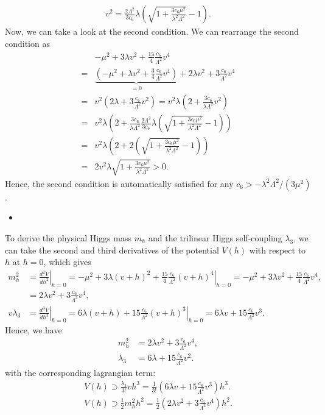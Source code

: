 \begin{align}
    v^2 = \frac{2\Lambda^2}{3 c_6} \lambda \left( \sqrt{1 + \frac{3 c_6 \mu^2}{\lambda^2 \Lambda^2}} - 1\right).
\end{align}
Now, we can take a look at the second condition. We can rearrange the second condition as
\begin{align}
    &-\mu^2 + 3\lambda v^2 + \frac{15}{4}\frac{c_6}{\Lambda^2} v^4 \\
    =&\underbrace{\left( -\mu^2  + \lambda v^2 + \frac{3}{4}\frac{c_6}{\Lambda^2} v^4 \right)}_{=0 }+ 2\lambda v^2 + 3\frac{c_6}{\Lambda^2} v^4 \\
    =&v^2 \left( 2\lambda + 3\frac{c_6}{\Lambda^2} v^2 \right)=v^2\lambda \left( 2 +  \frac{3 c_6}{\lambda \Lambda^2} v^2 \right) \\
    =&v^2\lambda \left( 2 +  \frac{3 c_6}{\lambda \Lambda^2} \frac{2\Lambda^2}{3 c_6} \lambda \left( \sqrt{1 + \frac{3 c_6 \mu^2}{\lambda^2 \Lambda^2}} - 1\right) \right) \\
    =&v^2\lambda \left( 2 + 2 \left( \sqrt{1 + \frac{3 c_6 \mu^2}{\lambda^2 \Lambda^2}} - 1\right) \right) \\
    =&2 v^2 \lambda \sqrt{1 + \frac{3 c_6 \mu^2}{\lambda^2 \Lambda^2}} >0.
\end{align}
Hence, the second condition is automatically satisfied for any $c_6>-\lambda^2 \Lambda^2/(3\mu^2)$.

\begin{itemize}
    \item [(b)]
\end{itemize}
To derive the physical Higgs mass $m_h$ and the trilinear Higgs self-coupling $\lambda_3$, we can take the second and third derivatives of the potential $V(h)$ with respect to $h$ at $h=0$, which gives
\begin{align}
    m_h^2 &= \left.\frac{d^2V}{dh^2}\right|_{h=0} = \left. -\mu^2 + 3\lambda (v+h)^2 +   \frac{15}{4}\frac{c_6}{\Lambda^2} (v+h)^4 \right|_{h=0} = -\mu^2 + 3\lambda v^2 + \frac{15}{4}\frac{c_6}{\Lambda^2} v^4, \\
    &= 2\lambda v^2 + 3\frac{c_6}{\Lambda^2} v^4, \\
    v\lambda_3 &= \left.\frac{d^3V}{dh^3}\right|_{h=0} = \left. 6\lambda (v+h) + 15 \frac{c_6}{\Lambda^2} (v+h)^3 \right|_{h=0} = 6\lambda v + 15 \frac{c_6}{\Lambda^2} v^3.
\end{align}
Hence, we have
\begin{align}
    m_h^2 &= 2\lambda v^2 + 3\frac{c_6}{\Lambda^2} v^4, \\
    \lambda_3 &= 6\lambda  + 15 \frac{c_6}{\Lambda^2} v^2.
\end{align}
with the corresponding lagrangian term:
\begin{align}
    V(h) \supset \frac{\lambda_3}{3!} vh^3 =\frac{1}{3!} \left(6\lambda v + 15 \frac{c_6}{\Lambda^2} v^3\right) h^3.\\
    V(h) \supset \frac{1}{2}m_h^2 h^2 = \frac{1}{2} \left( 2\lambda v^2 + 3\frac{c_6}{\Lambda^2} v^4 \right) h^2.
\end{align}

